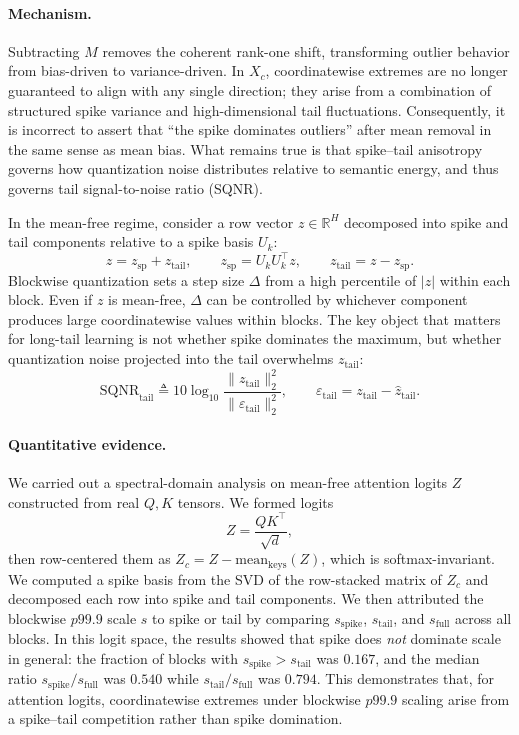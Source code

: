 \paragraph{Mechanism.}
Subtracting $M$ removes the coherent rank-one shift, transforming outlier behavior from bias-driven to variance-driven. In $X_c$, coordinatewise extremes are no longer guaranteed to align with any single direction; they arise from a combination of structured spike variance and high-dimensional tail fluctuations. Consequently, it is incorrect to assert that ``the spike dominates outliers'' after mean removal in the same sense as mean bias. What remains true is that spike--tail anisotropy governs how quantization noise distributes relative to semantic energy, and thus governs tail signal-to-noise ratio (SQNR).

In the mean-free regime, consider a row vector $z\in\mathbb{R}^H$ decomposed into spike and tail components relative to a spike basis $U_k$:
\[
z = z_{\mathrm{sp}} + z_{\mathrm{tail}},
\qquad
z_{\mathrm{sp}} = U_kU_k^\top z,
\qquad
z_{\mathrm{tail}} = z - z_{\mathrm{sp}}.
\]
Blockwise quantization sets a step size $\Delta$ from a high percentile of $|z|$ within each block. Even if $z$ is mean-free, $\Delta$ can be controlled by whichever component produces large coordinatewise values within blocks. The key object that matters for long-tail learning is not whether spike dominates the maximum, but whether quantization noise projected into the tail overwhelms $z_{\mathrm{tail}}$:
\[
\mathrm{SQNR}_{\mathrm{tail}} \triangleq 10\log_{10}\frac{\|z_{\mathrm{tail}}\|_2^2}{\|\varepsilon_{\mathrm{tail}}\|_2^2},
\qquad
\varepsilon_{\mathrm{tail}} = z_{\mathrm{tail}} - \widehat{z}_{\mathrm{tail}}.
\]

\paragraph{Quantitative evidence.}
We carried out a spectral-domain analysis on mean-free attention logits $Z$ constructed from real $Q,K$ tensors. We formed logits
\[
Z = \frac{QK^\top}{\sqrt{d}},
\]
then row-centered them as $Z_c = Z - \mathrm{mean}_{\text{keys}}(Z)$, which is softmax-invariant. We computed a spike basis from the SVD of the row-stacked matrix of $Z_c$ and decomposed each row into spike and tail components. We then attributed the blockwise $p99.9$ scale $s$ to spike or tail by comparing $s_{\mathrm{spike}}$, $s_{\mathrm{tail}}$, and $s_{\mathrm{full}}$ across all blocks. In this logit space, the results showed that spike does \emph{not} dominate scale in general: the fraction of blocks with $s_{\mathrm{spike}} > s_{\mathrm{tail}}$ was $0.167$, and the median ratio $s_{\mathrm{spike}}/s_{\mathrm{full}}$ was $0.540$ while $s_{\mathrm{tail}}/s_{\mathrm{full}}$ was $0.794$. This demonstrates that, for attention logits, coordinatewise extremes under blockwise $p99.9$ scaling arise from a spike--tail competition rather than spike domination.


